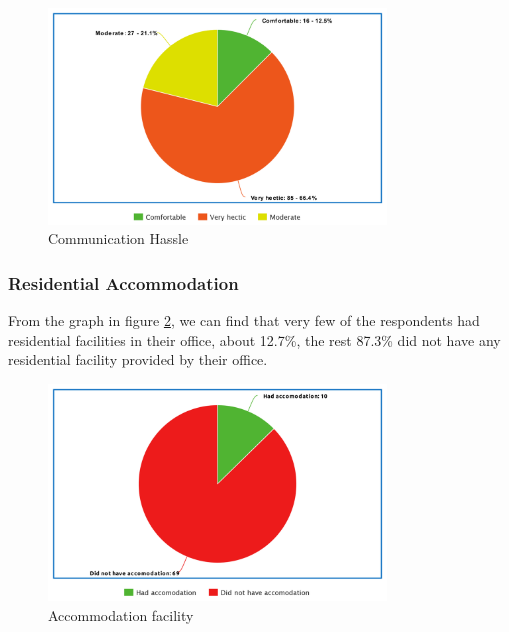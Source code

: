 \documentclass[11pt]{article}
\begin{document}
\begin{figure}[!ht]
	\centering
	\includegraphics[width=0.8\textwidth]{Images/Experience/commute.png}
	\caption{Communication Hassle}
	\centering
	\label{commute}
\end{figure}


\subsubsection{Residential Accommodation}
From the graph in figure \ref{Accommodation}, we can find that very few of the respondents had residential facilities in their office, about 12.7\%, the rest 87.3\% did not have any residential facility provided by their office.

\begin{figure}[!ht]
	\centering
	\includegraphics[width=0.8\textwidth]{Images/Experience/Accommodation.png}
	\caption{Accommodation facility}
	\centering
	\label{Accommodation}
\end{figure}
\end{document}
